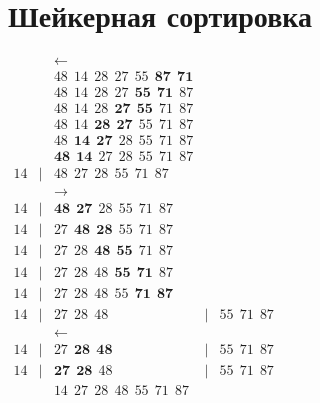 \documentclass{article}
\begin{document}
\section*{Шейкерная сортировка}
$\begin{array}{rcccl}
           &   & \leftarrow                                               &   &                \\
           &   & 48 ~~ 14 ~~ 28 ~~ 27 ~~ 55 ~~ \textbf{87} ~~ \textbf{71} &   &                \\
           &   & 48 ~~ 14 ~~ 28 ~~ 27 ~~ \textbf{55} ~~ \textbf{71} ~~ 87 &   &                \\
           &   & 48 ~~ 14 ~~ 28 ~~ \textbf{27} ~~ \textbf{55} ~~ 71 ~~ 87 &   &                \\
           &   & 48 ~~ 14 ~~ \textbf{28} ~~ \textbf{27} ~~ 55 ~~ 71 ~~ 87 &   &                \\
           &   & 48 ~~ \textbf{14} ~~ \textbf{27} ~~ 28 ~~ 55 ~~ 71 ~~ 87 &   &                \\
           &   & \textbf{48} ~~ \textbf{14} ~~ 27 ~~ 28 ~~ 55 ~~ 71 ~~ 87 &   &                \\
        14 & | & 48 ~~ 27 ~~ 28 ~~ 55 ~~ 71 ~~ 87                         &   &                \\
           &   & \rightarrow                                              &   &                \\
        14 & | & \textbf{48} ~~ \textbf{27} ~~ 28 ~~ 55 ~~ 71 ~~ 87       &   &                \\
        14 & | & 27 ~~ \textbf{48} ~~ \textbf{28} ~~ 55 ~~ 71 ~~ 87       &   &                \\
        14 & | & 27 ~~ 28 ~~ \textbf{48} ~~ \textbf{55} ~~ 71 ~~ 87       &   &                \\
        14 & | & 27 ~~ 28 ~~ 48 ~~ \textbf{55} ~~ \textbf{71} ~~ 87       &   &                \\
        14 & | & 27 ~~ 28 ~~ 48 ~~ 55 ~~ \textbf{71} ~~ \textbf{87}       &   &                \\
        14 & | & 27 ~~ 28 ~~ 48                                           & | & 55 ~~ 71 ~~ 87 \\
           &   & \leftarrow                                               &   &                \\
        14 & | & 27 ~~ \textbf{28} ~~ \textbf{48}                         & | & 55 ~~ 71 ~~ 87 \\
        14 & | & \textbf{27} ~~ \textbf{28} ~~ 48                         & | & 55 ~~ 71 ~~ 87 \\
           &   & 14 ~~ 27 ~~ 28 ~~ 48 ~~ 55 ~~ 71 ~~ 87                   &   &                \\
    \end{array}$
\end{document}
